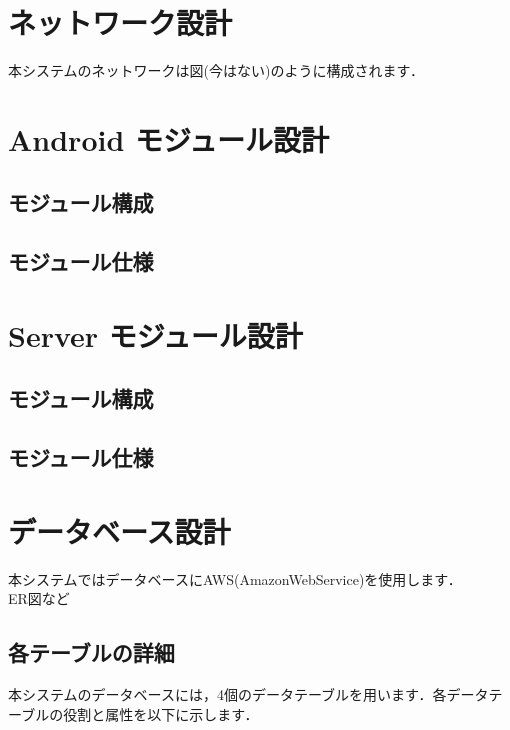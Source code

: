 \documentclass[a4j,titlepage]{jarticle}
\begin{document}
\section{ネットワーク設計}
本システムのネットワークは図(今はない)のように構成されます．

\section{Android モジュール設計}
\subsection{モジュール構成}
\subsection{モジュール仕様}


\section{Server モジュール設計}
\subsection{モジュール構成}
\subsection{モジュール仕様}


\section{データベース設計}
本システムではデータベースにAWS(AmazonWebService)を使用します．\\
ER図など
\subsection{各テーブルの詳細}
本システムのデータベースには，4個のデータテーブルを用います．各データテーブルの役割と属性を以下に示します．
\end{document}
